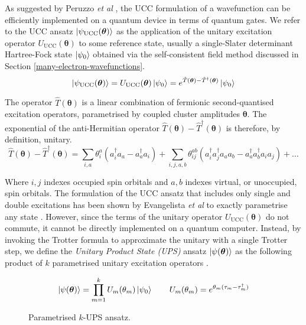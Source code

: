 As suggested by Peruzzo \textit{et al} \cite{Peruzzo2014}, the UCC formulation of a wavefunction can be efficiently implemented on a quantum device in terms of quantum gates. We refer to the UCC ansatz $\ket{\psi_{\text{UCC}}(\bm\theta)}$ as the application of the unitary excitation operator $U_\text{UCC}(\bm\theta)$ to some reference state, usually a single-Slater determinant Hartree-Fock state $\ket{\psi_0}$ obtained via the self-consistent field method discussed in Section \ref{many-electron-wavefunctions}.
\begin{equation*}
    \ket{\psi_{\text{UCC}}(\bm\theta)} = U_\text{UCC}(\bm\theta) \ket{\psi_0} =
    e^{\hat T(\bm\theta) - \hat T^\dagger(\bm\theta)} \ket{\psi_0}
\end{equation*}

The operator $\hat T(\bm\theta)$ is a linear combination of fermionic second-quantised excitation operators, parametrised by coupled cluster amplitudes $\bm\theta$. The exponential of the anti-Hermitian operator $\hat T(\bm\theta) - \hat T^\dagger(\bm\theta)$ is therefore, by definition, unitary. 
\begin{equation*}
\hat T(\bm{\theta}) - \hat T^{\dagger}(\bm{\theta}) =
\sum_{i, a} \theta^a_i (a^\dagger_i a_a - a^\dagger_a a_i) + 
\sum_{i, j, a, b} \theta^{ab}_{ij} (a^\dagger_i a^\dagger_j a_a a_b - a^\dagger_a a^\dagger_b a_i a_j) + \dots
\end{equation*}

Where $i, j$ indexes occupied spin orbitals and $a, b$ indexes virtual, or unoccupied, spin orbitals. The formulation of the UCC ansatz that includes only single and double excitations has been shown by Evangelista \textit{et al} to exactly parametrise any state \cite{Evangelista2019}. However, since the terms of the unitary operator $U_\text{UCC}(\bm\theta)$ do not commute, it cannot be directly implemented on a quantum computer. Instead, by invoking the Trotter formula to approximate the unitary with a single Trotter step, we define the \textit{Unitary Product State (UPS)} ansatz $\ket{\psi(\bm\theta)}$ as the following product of $k$ parametrised unitary excitation operators \cite{Burton2023}.

\begin{figure}[H]
    \centering
    \begin{equation*}
        \ket{\psi(\bm\theta)} = \prod_{m=1}^k U_m(\theta_m) \ket{\psi_0} \qquad
        U_m(\theta_m) = e^{\theta_m (\tau_m - \tau_m^\dagger)}
    \end{equation*}
    \caption{Parametrised $k$-UPS ansatz.}
\end{figure}

